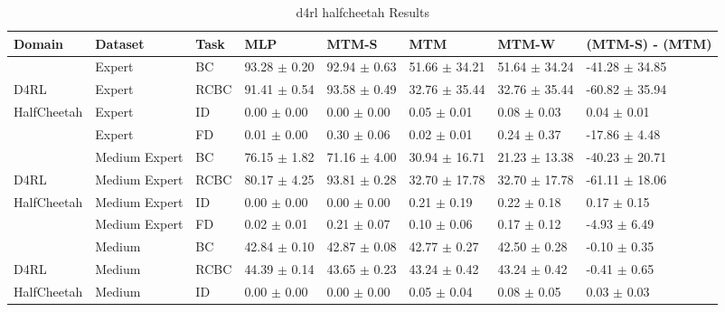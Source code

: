 \begin{table*}
  \small
  \caption{d4rl halfcheetah Results}
  \label{tab:d4rl_halfcheetah}
  \centering
  \begin{tabular}{l l l l l l l l}
    \toprule
     Domain &       Dataset & Task &              MLP &            MTM-S &               MTM &             MTM-W &                                     (MTM-S) - (MTM) \\
    \midrule
            &        Expert &   BC & 93.28 $\pm$ 0.20 & 92.94 $\pm$ 0.63 & 51.66 $\pm$ 34.21 & 51.64 $\pm$ 34.24 & \textcolor[rgb]{1.00,0.00,0.00}{-41.28 $\pm$ 34.85} \\
       D4RL &        Expert & RCBC & 91.41 $\pm$ 0.54 & 93.58 $\pm$ 0.49 & 32.76 $\pm$ 35.44 & 32.76 $\pm$ 35.44 & \textcolor[rgb]{1.00,0.00,0.00}{-60.82 $\pm$ 35.94} \\
HalfCheetah &        Expert &   ID &  0.00 $\pm$ 0.00 &  0.00 $\pm$ 0.00 &   0.05 $\pm$ 0.01 &   0.08 $\pm$ 0.03 &    \textcolor[rgb]{0.00,0.00,0.00}{0.04 $\pm$ 0.01} \\
            &        Expert &   FD &  0.01 $\pm$ 0.00 &  0.30 $\pm$ 0.06 &   0.02 $\pm$ 0.01 &   0.24 $\pm$ 0.37 &  \textcolor[rgb]{0.00,1.00,0.00}{-17.86 $\pm$ 4.48} \\
    \midrule
            & Medium Expert &   BC & 76.15 $\pm$ 1.82 & 71.16 $\pm$ 4.00 & 30.94 $\pm$ 16.71 & 21.23 $\pm$ 13.38 & \textcolor[rgb]{1.00,0.00,0.00}{-40.23 $\pm$ 20.71} \\
       D4RL & Medium Expert & RCBC & 80.17 $\pm$ 4.25 & 93.81 $\pm$ 0.28 & 32.70 $\pm$ 17.78 & 32.70 $\pm$ 17.78 & \textcolor[rgb]{1.00,0.00,0.00}{-61.11 $\pm$ 18.06} \\
HalfCheetah & Medium Expert &   ID &  0.00 $\pm$ 0.00 &  0.00 $\pm$ 0.00 &   0.21 $\pm$ 0.19 &   0.22 $\pm$ 0.18 &    \textcolor[rgb]{0.50,0.00,0.00}{0.17 $\pm$ 0.15} \\
            & Medium Expert &   FD &  0.02 $\pm$ 0.01 &  0.21 $\pm$ 0.07 &   0.10 $\pm$ 0.06 &   0.17 $\pm$ 0.12 &   \textcolor[rgb]{0.00,1.00,0.00}{-4.93 $\pm$ 6.49} \\
    \midrule
            &        Medium &   BC & 42.84 $\pm$ 0.10 & 42.87 $\pm$ 0.08 &  42.77 $\pm$ 0.27 &  42.50 $\pm$ 0.28 &                                    -0.10 $\pm$ 0.35 \\
       D4RL &        Medium & RCBC & 44.39 $\pm$ 0.14 & 43.65 $\pm$ 0.23 &  43.24 $\pm$ 0.42 &  43.24 $\pm$ 0.42 &   \textcolor[rgb]{0.17,0.00,0.00}{-0.41 $\pm$ 0.65} \\
HalfCheetah &        Medium &   ID &  0.00 $\pm$ 0.00 &  0.00 $\pm$ 0.00 &   0.05 $\pm$ 0.04 &   0.08 $\pm$ 0.05 &    \textcolor[rgb]{0.00,0.00,0.00}{0.03 $\pm$ 0.03} \\

\end{tabular}
\end{table*}
